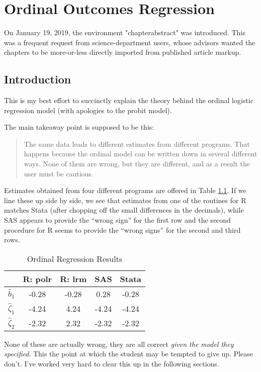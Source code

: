 
\chapter{Ordinal Outcomes Regression}

\begin{chapterabstract}
On January 19, 2019, the environment "chapterabstract" was introduced.  This was a frequent request from science-department users, whose advisors wanted the chapters to be more-or-less directly imported from published article markup. 
\end{chapterabstract}

\section{Introduction}

This is my best effort to succinctly explain the theory behind the
ordinal logistic regression model (with apologies to the probit model). 

The main takeaway point is supposed to be this: 
\begin{quote}
The same data leads to different estimates from different programs.
That happens because the ordinal model can be written down in several
different ways. None of them are wrong, but they are different, and
as a result the user must be cautious.
\end{quote}
Estimates obtained from four different programs are offered in Table
\ref{tab:Ordinal-Regression-Results}. If we line these up side by
side, we see that estimates from one of the routines for R matches
Stata (after chopping off the small differences in the decimals),
while SAS appears to provide the ``wrong sign'' for the first row
and the second procedure for R seems to provide the ``wrong signs''
for the second and third rows.

\begin{table}

\caption{Ordinal Regression Results\label{tab:Ordinal-Regression-Results}}

\centering{}%
\begin{tabular}{|c|c|c|c|c|}
\hline 
 & R: polr & R: lrm & SAS & Stata\tabularnewline
\hline 
\hline 
$\hat{b}_{1}$ & -0.28 & -0.28 & 0.28 & -0.28\tabularnewline
\hline 
$\hat{\zeta}_{1}$ & -4.24 & 4.24 & -4.24 & -4.24\tabularnewline
\hline 
$\hat{\zeta}_{2}$ & -2.32 & 2.32 & -2.32 & -2.32\tabularnewline
\hline 
\end{tabular}
\end{table}
\noindent None of these are actually wrong, they are all correct \emph{given
the model they specified}. This the point at which the student may
be tempted to give up. Please don't. I've worked very hard to clear
this up in the following sections.

